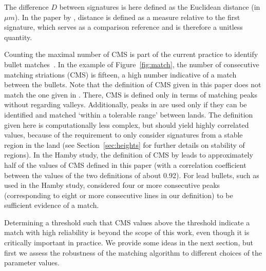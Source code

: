 \documentclass[aoas, preprint]{imsart}\usepackage[]{graphicx}\usepackage[]{color}
\begin{document}
%
The difference $D$ between signatures is here defined as the Euclidean distance (in $\mu m$). In the paper by \citet{ma:2004}, distance is defined as a measure relative to the first signature, which serves as a comparison reference and is therefore a unitless quantity. 

Counting the maximal number of CMS is part of the current practice to identify bullet matches~\citep{nichols:1997, nichols:2003, nichols:2003b}. 
In the example of Figure~\ref{fig:match}, the number of consecutive matching striations (CMS) is fifteen, a high number indicative of a match between the bullets. 
 Note that the definition of CMS given in this paper does not match the one given in \citet{thompson:2013}. There, CMS is defined only in terms of matching peaks without regarding valleys. Additionally, peaks in  \citet{thompson:2013} are  used only if they can be identified and matched `within a tolerable range' between lands. The definition given here is computationally less complex, but should yield highly correlated values, because of the requirement to only consider signatures from a stable region in the land (see Section~\ref{sec:heights} for further details on stability of regions). In the Hamby study, the definition of CMS by \citet{thompson:2013} leads to approximately half of the values of CMS defined in this paper (with a correlation coefficient between the values of the two definitions of about 0.92). 
For lead bullets, such as used in the Hamby study, \citet{biasotti:1959} considered four or more consecutive peaks (corresponding to eight or more consecutive lines in our definition) to be sufficient evidence of a match.  %

Determining a threshold such that CMS values above the threshold indicate a match with high reliability is beyond the scope of this work, even though it is critically important in practice. We provide some ideas in the next section, but first we assess the robustness of the matching algorithm to different choices of the parameter values. 
\end{document}
